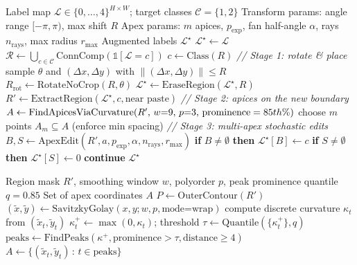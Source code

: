 \documentclass[12pt]{article}
\begin{document}
\begin{algorithm}[H]
\caption{MORP (minimal pipeline)}
\label{alg:morp}
\begin{algorithmic}[1]
\Require Label map $\mathcal{L}\in\{0,\dots,4\}^{H\times W}$; target classes $\mathcal{C}=\{1,2\}$
\Require Transform params: angle range $[-\pi,\pi)$, max shift $R$
\Require Apex params: $m$ apices, $p_{\mathrm{exp}}$, fan half-angle $\alpha$, rays $n_{\mathrm{rays}}$, max radius $r_{\max}$
\Ensure Augmented labels $\mathcal{L}^\star$
\State $\mathcal{L}^\star \gets \mathcal{L}$
\State $\mathcal{R} \gets \bigcup_{c\in\mathcal{C}}\mathrm{ConnComp}(\mathbb{1}[\mathcal{L}{=}c])$ 
 
  \State $c \gets \mathrm{Class}(R)$
  \State \textit{// Stage 1: rotate \& place}
  \State sample $\theta$ and $(\Delta x,\Delta y)$ with $\|\!(\Delta x,\Delta y)\!\|\le R$
  \State $R_{\mathrm{rot}} \gets \mathrm{RotateNoCrop}(R,\theta)$
  \State $\mathcal{L}^\star \gets \mathrm{EraseRegion}(\mathcal{L}^\star,R)$
    \State $R' \gets \mathrm{ExtractRegion}(\mathcal{L}^\star,c,\text{near paste})$
    \State \textit{// Stage 2: apices on the new boundary}
    \State $A \gets \mathrm{FindApicesViaCurvature}(R',\, w{=}9,\, p{=}3,\, \text{prominence}=85{\small th}\%)$
    \State choose $m$ points $A_m \subseteq A$ (enforce min spacing)
    \State \textit{// Stage 3: multi-apex stochastic edits}
      \State $B,S \gets \mathrm{ApexEdit}(R', a, p_{\mathrm{exp}}, \alpha, n_{\mathrm{rays}}, r_{\max})$
      \State \textbf{if} $B\!\neq\!\emptyset$ \textbf{ then } $\mathcal{L}^\star[B]\gets c$ 
      \State \textbf{if} $S\!\neq\!\emptyset$ \textbf{ then } $\mathcal{L}^\star[S]\gets 0$ 
    \EndFor
  \Else
    \State \textbf{continue} 
  \Fi
\EndFor
\State \Return $\mathcal{L}^\star$
\end{algorithmic}
\end{algorithm}

\begin{algorithm}[H]
\caption{FindApicesViaCurvature (contour peaks)}
\label{alg:apices}
\begin{algorithmic}[1]
\Require Region mask $R'$, smoothing window $w$, polyorder $p$, peak prominence quantile $q{=}0.85$
\Ensure Set of apex coordinates $A$
\State $P \gets \mathrm{OuterContour}(R')$ 
\State $(\tilde{x},\tilde{y}) \gets \mathrm{SavitzkyGolay}(x,y; w,p,\text{mode=wrap})$
\State compute discrete curvature $\kappa_t$ from $(\tilde{x}_t,\tilde{y}_t)$
\State $\kappa^{+}_t \gets \max(0,\kappa_t)$; threshold $\tau \gets \mathrm{Quantile}(\{\kappa^{+}_t\},q)$
\State $\text{peaks} \gets \mathrm{FindPeaks}(\kappa^{+},\text{prominence}>\tau,\text{distance}\ge4)$
\State \Return $A \gets \{(\tilde{x}_t,\tilde{y}_t)\,:\, t\in\text{peaks}\}$
\end{algorithmic}
\end{algorithm}
\end{document}
